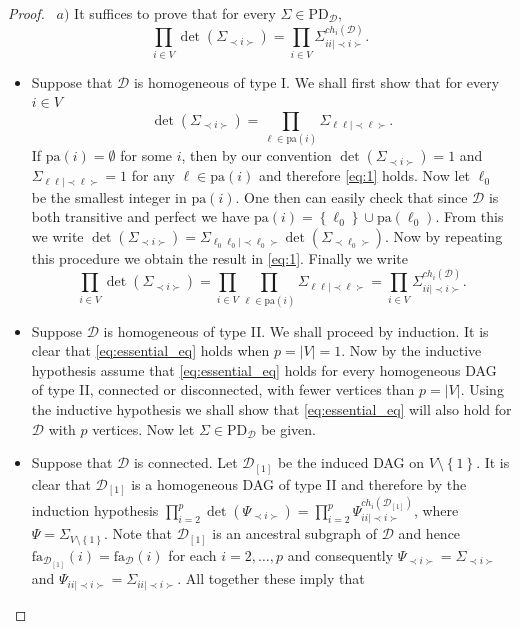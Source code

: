 \documentclass[12pt]{article}
\newcommand{\D}{\mathcal{D}}
\theoremstyle{plain}
\theoremstyle{definition}
\theoremstyle{remark}
\begin{document}
 \begin{proof}~$a)$ It suffices to prove that for every $\Sigma\in\mathrm{PD}_\D$,
 \begin{equation}\label{eq:essential_eq}
\prod_{i\in V}\det(\Sigma_{\prec i\succ})= \prod_{i\in V}\Sigma_{ii| \prec i\succ}^{ch_{i}(\D)}.
\end{equation}
\begin{itemize}
\renewcommand{\labelitemi}{1)}
\item Suppose that $\D$ is homogeneous of type I. We shall first show that for every $i\in V$
\begin{equation}\label{eq:1}
\det(\Sigma_{\prec i\succ})=\prod_{\ell\in \mathrm{pa}(i)}\Sigma_{\ell\ell|\prec \ell\succ}.
\end{equation}
If $\mathrm{pa}(i)=\emptyset$ for some $i$, then by our convention $\det(\Sigma_{\prec i\succ})=1$  and $\Sigma_{\ell\ell|\prec \ell\succ}=1$ for any $\ell\in\mathrm{pa}(i)$ and therefore  \eqref{eq:1} holds. Now let $\ell_{0}$ be the smallest integer in $\mathrm{pa}(i)$. One then can easily check that since $\D$ is both transitive and perfect we have $\mathrm{pa}(i)=\left\{\ell_{0}\right\}\cup\mathrm{pa}(\ell_{0})$. From this we write $\det(\Sigma_{\prec i\succ})=\Sigma_{\ell_{0}\ell_{0}|\prec \ell_{0}\succ}\det(\Sigma_{\prec\ell_{0}\succ})$. Now by repeating this procedure we obtain the result in \eqref{eq:1}. Finally we write 
$$\prod_{i\in V}\det(\Sigma_{\prec i\succ})=\prod_{i\in V}\prod_{\ell\in\mathrm{pa}(i)}\Sigma_{\ell\ell|\prec \ell\succ}=\prod_{i\in V}\Sigma_{ii|\prec i\succ}^{ch_{i}(\D)}.$$
\renewcommand{\labelitemi}{2)}
\item Suppose $\D$ is homogeneous of type II. We shall proceed by induction. It is clear that  \eqref{eq:essential_eq} holds when $p=|V|=1$. Now by the inductive hypothesis assume that  \eqref{eq:essential_eq} holds for every homogeneous DAG of type II, connected or disconnected, with fewer vertices than $p=|V|$. Using the inductive hypothesis we shall show that  \eqref{eq:essential_eq} will also hold for $\D$ with $p$ vertices. Now let $\Sigma\in \mathrm{PD}_\D$ be given.
\end{itemize}
\begin{itemize}
\renewcommand{\labelitemi}{Case 1)}
\item Suppose that $\D$ is connected. Let $\D_{[1]}$ be the induced DAG on $V\setminus\left\{1\right\}$. It is clear that $\D_{[1]}$ is a homogeneous DAG of type II and therefore by the induction hypothesis $\prod_{i=2}^{p}\det(\Psi_{\prec i\succ})= \prod_{i=2}^{p}\Psi_{ii| \prec i\succ}^{ch_{i}(\D_{[1]})}$, where $\Psi=\Sigma_{V\setminus\left\{1\right\}}$. Note that $\D_{[1]}$ is an ancestral subgraph of $\D$ and hence $\mathrm{fa}_{{\mathcal D}_{[1]}}(i)=\mathrm{fa}_\D(i)$ for each $i=2,\ldots, p$ and consequently $\Psi_{\prec i \succ}=\Sigma_{\prec i \succ}$ and $\Psi_{ii| \prec i\succ}=\Sigma_{ii|\prec i\succ}$. All together these imply that

\end{itemize}
\end{proof}
\end{document}
